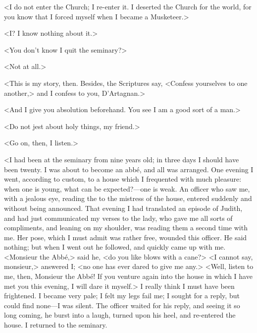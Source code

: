 <I do not enter the Church; I re-enter it. I deserted the Church for the world, for you know that I forced myself when I became a Musketeer.> 

<I? I know nothing about it.> 

<You don't know I quit the seminary?> 

<Not at all.> 

<This is my story, then. Besides, the Scriptures say, <Confess yourselves to one another,> and I confess to you, D'Artagnan.> 

<And I give you absolution beforehand. You see I am a good sort of a man.> 

<Do not jest about holy things, my friend.> 

<Go on, then, I listen.> 

<I had been at the seminary from nine years old; in three days I should have been twenty. I was about to become an abbé, and all was arranged. One evening I went, according to custom, to a house which I frequented with much pleasure: when one is young, what can be expected?—one is weak. An officer who saw me, with a jealous eye, reading the  to the mistress of the house, entered suddenly and without being announced. That evening I had translated an episode of Judith, and had just communicated my verses to the lady, who gave me all sorts of compliments, and leaning on my shoulder, was reading them a second time with me. Her pose, which I must admit was rather free, wounded this officer. He said nothing; but when I went out he followed, and quickly came up with me. <Monsieur the Abbé,> said he, <do you like blows with a cane?> <I cannot say, monsieur,> answered I; <no one has ever dared to give me any.> <Well, listen to me, then, Monsieur the Abbé! If you venture again into the house in which I have met you this evening, I will dare it myself.> I really think I must have been frightened. I became very pale; I felt my legs fail me; I sought for a reply, but could find none—I was silent. The officer waited for his reply, and seeing it so long coming, he burst into a laugh, turned upon his heel, and re-entered the house. I returned to the seminary. 

